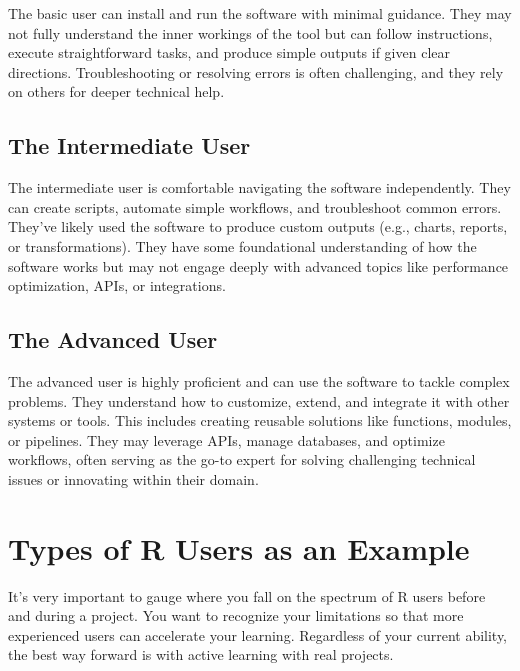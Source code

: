 \documentclass[
]{book}
\begin{document}
The basic user can install and run the software with minimal guidance. They may not fully understand the inner workings of the tool but can follow instructions, execute straightforward tasks, and produce simple outputs if given clear directions. Troubleshooting or resolving errors is often challenging, and they rely on others for deeper technical help.

\subsection*{The Intermediate User}\label{the-intermediate-user}

The intermediate user is comfortable navigating the software independently. They can create scripts, automate simple workflows, and troubleshoot common errors. They've likely used the software to produce custom outputs (e.g., charts, reports, or transformations). They have some foundational understanding of how the software works but may not engage deeply with advanced topics like performance optimization, APIs, or integrations.

\subsection*{The Advanced User}\label{the-advanced-user}

The advanced user is highly proficient and can use the software to tackle complex problems. They understand how to customize, extend, and integrate it with other systems or tools. This includes creating reusable solutions like functions, modules, or pipelines. They may leverage APIs, manage databases, and optimize workflows, often serving as the go-to expert for solving challenging technical issues or innovating within their domain.

\section{Types of R Users as an Example}\label{types-of-r-users-as-an-example}

It's very important to gauge where you fall on the spectrum of R users before and during a project. You want to recognize your limitations so that more experienced users can accelerate your learning. Regardless of your current ability, the best way forward is with active learning with real projects.
\end{document}
